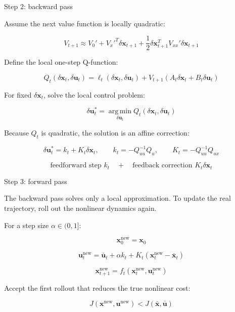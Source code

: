 \documentclass[aspectratio=169]{beamer}
\begin{document}
\begin{frame}[t]{Step 2: backward pass}
\small

Assume the next value function is locally quadratic:

\[
V_{t+1}
\approx
V_0'
+
{V_x'}^T\delta\bm{x}_{t+1}
+
\frac{1}{2}\delta\bm{x}_{t+1}^T V_{xx}'\delta\bm{x}_{t+1}
\]

Define the local one-step Q-function:

\[
Q_t(\delta\bm{x}_t,\delta\bm{u}_t)
=
\ell_t(\delta\bm{x}_t,\delta\bm{u}_t)
+
V_{t+1}(A_t\delta\bm{x}_t+B_t\delta\bm{u}_t)
\]

For fixed $\delta\bm{x}_t$, solve the local control problem:

\[
\delta\bm{u}_t^*
=
\operatorname*{arg\,min}_{\delta\bm{u}_t}
Q_t(\delta\bm{x}_t,\delta\bm{u}_t)
\]

Because $Q_t$ is quadratic, the solution is an affine correction:

\[
\delta\bm{u}_t^*
=
k_t+K_t\delta\bm{x}_t,
\qquad
k_t=-Q_{uu}^{-1}Q_u,
\qquad
K_t=-Q_{uu}^{-1}Q_{ux}
\]

\vspace{0.1cm}

\[
\text{feedforward step } k_t
\quad + \quad
\text{feedback correction } K_t\delta\bm{x}_t
\]

\end{frame}

\begin{frame}[t]{Step 3: forward pass}
\large

The backward pass solves only a local approximation.
To update the real trajectory, roll out the nonlinear dynamics again.

\vspace{0.2cm}

For a step size $\alpha\in(0,1]$:

\[
\bm{x}^{\mathrm{new}}_0=\bm{x}_0
\]

\[
\bm{u}^{\mathrm{new}}_t
=
\bar{\bm{u}}_t
+
\alpha k_t
+
K_t(\bm{x}^{\mathrm{new}}_t-\bar{\bm{x}}_t)
\]

\[
\bm{x}^{\mathrm{new}}_{t+1}
=
f_t(\bm{x}^{\mathrm{new}}_t,\bm{u}^{\mathrm{new}}_t)
\]

\vspace{0.15cm}

Accept the first rollout that reduces the true nonlinear cost:

\[
J(\bm{x}^{\mathrm{new}},\bm{u}^{\mathrm{new}})
<
J(\bar{\bm{x}},\bar{\bm{u}})
\]

\end{frame}
\end{document}
